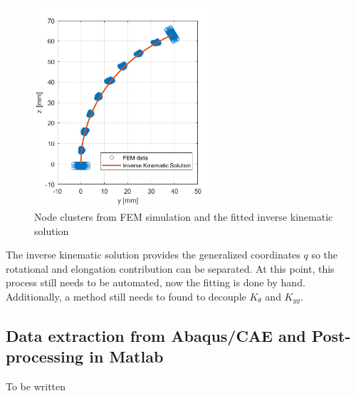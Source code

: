 \begin{figure}[H]
    \centering
    \includegraphics[width = 0.6\textwidth]{Figures/Chapter3/kinfit.png}
    \caption{Node clusters from FEM simulation and the fitted inverse kinematic solution}
    \label{fig4:midnodesfit}
\end{figure}

The inverse kinematic solution provides the generalized coordinates $q$ so the rotational and elongation contribution can be separated. At this point, this process still needs to be automated, now the fitting is done by hand. Additionally, a method still needs to found to decouple $K_{\theta}$ and $K_{yy}$.







\subsection{Data extraction from Abaqus/CAE and Post-processing in Matlab}


To be written